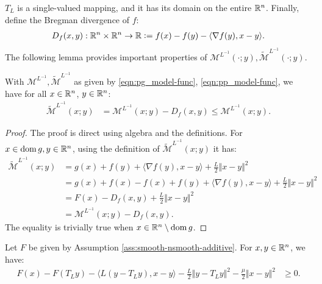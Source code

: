 \documentclass[12pt]{article}
\begin{document}
    $T_L$ is a single-valued mapping, and it has its domain on the entire $\mathbb R^n$. 
    Finally, define the Bregman divergence of $f$: 
    \begin{align*}
        D_f(x, y): \mathbb R^n \times \mathbb R^n \rightarrow \mathbb R 
        \vcentcolon= f(x) - f(y) - \langle \nabla f(y), x - y\rangle. 
    \end{align*}
    The following lemma provides important properties of $\mathcal M^{L^{-1}}(\cdot; y), \widetilde{\mathcal M}^{L^{-1}}(\cdot; y)$. 
    \begin{lemma}\label{lemma:pg-envelope}
        With $\mathcal M^{L^{-1}}, \widetilde{\mathcal M}^{L^{-1}}$ as given by \eqref{eqn:pg_model-func}, \eqref{eqn:pp_model-func}, 
        we have for all $x \in \mathbb R^n$, $y \in \mathbb R^n$:
        \begin{align*}
            \widetilde{\mathcal M}^{L^{-1}}(x; y)
            &= 
            \mathcal M^{L^{-1}}(x; y)- D_f(x, y) \le \mathcal M^{L^{-1}}(x; y). 
        \end{align*}
    \end{lemma}
    \begin{proof}
        The proof is direct using algebra and the definitions. 
        For $x \in \operatorname{dom} g, y \in \mathbb R^n$, using the definition of $\widetilde{\mathcal M}^{L^{-1}}(x; y)$ it has: 
        \begin{align*}
            \widetilde{\mathcal M}^{L^{-1}}(x; y) 
            &= 
            g(x) + f(y) + \langle \nabla f(y), x - y\rangle + \frac{L}{2}\Vert x - y\Vert^2
            \\
            &= 
            g(x) + f(x) - f(x) + f(y) 
            + \langle \nabla f(y), x - y\rangle + \frac{L}{2}\Vert x - y\Vert^2
            \\
            &= 
            F(x) - D_f(x, y) + \frac{L}{2}\Vert x - y\Vert^2 
            \\
            &= \mathcal M^{L^{-1}}(x; y) - D_f(x, y). 
        \end{align*}
        The equality is trivially true when $x \in \mathbb R^n \setminus \operatorname{dom} g$. 
    \end{proof}
    \begin{theorem}\label{thm:prox-grad-ineq}
        Let $F$ be given by Assumption \ref{ass:smooth-nsmooth-additive}. 
        For $x,y\in \mathbb R^n$, we have: 
        \begin{align*}
            F(x) - F(T_Ly) - \langle L(y - T_Ly), x - y\rangle
            - \frac{L}{2}\Vert y - T_L y\Vert^2
            - \frac{\mu}{2}\Vert x - y\Vert^2
            &\ge  
            0.
        \end{align*}
    \end{theorem}
\end{document}
